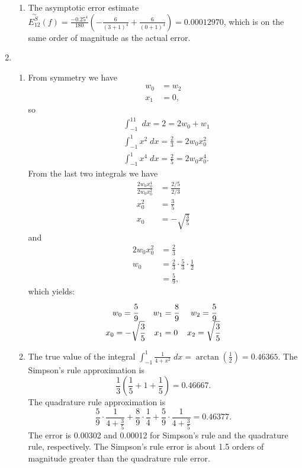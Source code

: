 \documentclass[11pt,letterpaper]{article}
\begin{document}
\begin{enumerate}
\begin{enumerate}
      \item The asymptotic error estimate $\overset{\sim}{E_{12}^S}(f)
        = \frac{-0.25^4}{180}\left(-\frac{6}{(3+1)^4}+\frac{6}{(0+1)^4}\right)
        = \boxed{0.00012970}$, which is on the same order of magnitude as the
        actual error.
    \end{enumerate}

  \item
    \begin{enumerate}
      \item From symmetry we have
        \begin{align*}
          w_0 &= w_2 \\
          x_1 &= 0,
        \end{align*}
        so
        \begin{align*}
          &\int_{-1}^11\;dx   = 2 = 2w_0 + w_1 \\
          &\int_{-1}^1x^2\;dx = \frac23 = 2w_0x_0^2 \\
          &\int_{-1}^1x^4\;dx = \frac25 = 2w_0x_0^4.
        \end{align*}
        From the last two integrals we have
        \begin{align*}
          \frac{2w_0x_0^4}{2w_0x_0^2} &= \frac{2/5}{2/3} \\
          x_0^2 &= \frac35 \\
          x_0 &= -\sqrt{\frac35}
        \end{align*}
        and
        \begin{align*}
          2w_0x_0^2 &= \frac23 \\
          w_0 &= \frac23 \cdot \frac53 \cdot \frac12 \\
              &= \frac59,
        \end{align*}
        which yields:
        \begin{align*}
          \begin{matrix}
            w_0 = \cfrac59         & w_1 = \cfrac89 & w_2 = \cfrac59 \\
            x_0 = -\sqrt{\cfrac35} & x_1 = 0        & x_2 = \sqrt{\cfrac35}
          \end{matrix}
        \end{align*}

      \item The true value of the integral $\int_{-1}^1\frac{1}{4+x^2}\;dx = \arctan(\frac12) = 0.46365$.
        The Simpson's rule approximation is \[\frac13\left(\frac15+1+\frac15\right) = 0.46667.\]
        The quadrature rule approximation is \[\frac59\cdot\frac{1}{4+\frac35} + \frac89\cdot\frac14 + \frac59\cdot\frac{1}{4+\frac35} = 0.46377.\]
        The error is 0.00302 and 0.00012 for Simpson's rule and the quadrature
        rule, respectively. The Simpson's rule error is about 1.5 orders of
        magnitude greater than the quadrature rule error.
    \end{enumerate}
\end{enumerate}
\end{document}
